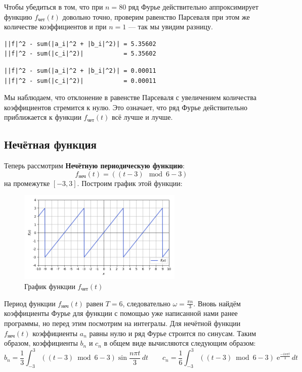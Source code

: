 \documentclass[a4paper]{article}
\newcommand{\e}{\;\text{e}}
\begin{document}
Чтобы убедиться в том, что при $n = 80$ ряд Фурье действительно аппроксимирует функцию $f_\text{чет}(t)$ довольно точно, проверим равенство Парсеваля при этом же количестве коэффициентов и при $n = 1$ --- так мы увидим разницу.

\begin{minipage}{0.48\textwidth}
\begin{lstlisting}[caption={Равенство Парсеваля при $n=1$}]
||f|^2 - sum(|a_i|^2 + |b_i|^2)| = 5.35602
||f|^2 - sum(|c_i|^2)|           = 5.35602
\end{lstlisting}
\end{minipage}\hfill
\begin{minipage}{0.48\textwidth}
\begin{lstlisting}[caption={Равенство Парсеваля при $n=80$}, numbers=none]
||f|^2 - sum(|a_i|^2 + |b_i|^2)| = 0.00011
||f|^2 - sum(|c_i|^2)|           = 0.00011
\end{lstlisting}
\end{minipage}
Мы наблюдаем, что отклонение в равенстве Парсеваля с увеличением количества коэффициентов стремится к нулю. Это означает, что ряд Фурье действительно приближается к функции $f_\text{чет}(t)$ всё лучше и лучше.

\subsection{Нечётная функция}
Теперь рассмотрим \textbf{Нечётную  периодическую функцию}: $$f_\text{неч}(t) =((t-3) \mod 6 - 3)$$ на промежутке $\left[-3, 3\right]$. Построим график этой функции:
\begin{figure}[H]
    \centering 
    \includegraphics[width=0.7\textwidth]{odd/func.png}
    \caption{График функции $f_\text{чет}(t)$}
\end{figure}

Период функции $f_\text{неч}(t)$ равен $T=6$, следовательно $\omega=\frac{\pi n}{3}$. Вновь найдём коэффициенты Фурье для функции с помощью уже написанной нами ранее программы, но перед этим посмотрим на интегралы. Для нечётной функции $f_\text{неч}(t)$ коэффициенты $a_n$ равны нулю и ряд Фурье строится по синусам. Таким образом, коэффициенты $b_n$ и $c_n$ в общем виде вычисляются следующим образом:
$$b_n = \frac{1}{3}\int_{-3}^{3} \left( (t - 3) \bmod 6 - 3 \right)\sin \frac{n\pi t}{3}\,dt\qquad c_n = \frac{1}{6}\int_{-3}^{3}\left( (t - 3) \bmod 6 - 3 \right)\e^{\frac{-in\pi t}{3}}\,dt$$
\end{document}
